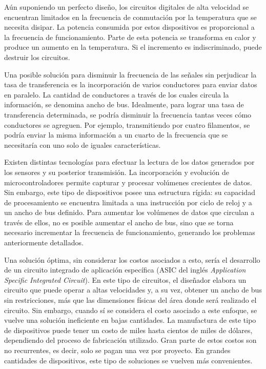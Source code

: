 Aún suponiendo un perfecto diseño, los circuitos digitales de alta velocidad se encuentran limitados en la frecuencia de conmutación por la temperatura que se necesita disipar. La potencia consumida por estos dispositivos es proporcional a la frecuencia de funcionamiento\cite{Wakerly1999}. Parte de esta potencia se transforma en calor y produce un aumento en la temperatura. Si el incremento es indiscriminado, puede destruir los circuitos.%

Una posible solución para disminuir la frecuencia de las señales sin perjudicar la tasa de transferencia es la incorporación de varios conductores para enviar datos en paralelo.
La cantidad de conductores a través de los cuales circula la información, se denomina ancho de bus. Idealmente, para lograr una tasa de transferencia determinada, se podría disminuir la frecuencia tantas veces cómo conductores se agreguen. Por ejemplo, transmitiendo por cuatro filamentos, se podría enviar la misma información a un cuarto de la frecuencia que se necesitaría con uno solo de iguales características.%

Existen distintas tecnologías para efectuar la lectura de los datos generados por los sensores y su posterior transmisión. La incorporación y evolución de microcontroladores permite capturar y procesar volúmenes crecientes de datos. Sin embargo, este tipo de dispositivos posee una estructura rígida: su capacidad de procesamiento se encuentra limitada a una instrucción por ciclo de reloj y a un ancho de bus definido. Para aumentar los volúmenes de datos que circulan a través de ellos, no es posible aumentar el ancho de bus, sino que se torna necesario incrementar la frecuencia de funcionamiento, generando los problemas anteriormente detallados.%

Una solución óptima, sin considerar los costos asociados a esto, sería el desarrollo de un circuito integrado de aplicación específica (ASIC del inglés {\it Application Specific Integrated Circuit}). En este tipo de circuitos, el diseñador elabora un circuito que puede operar a altas velocidades y, a su vez, obtener un ancho de bus sin restricciones, más que las dimensiones físicas del área donde será realizado el circuito. Sin embargo, cuando sí se considera el costo asociado a este enfoque, se vuelve una solución ineficiente en bajas cantidades. La manufactura de este tipo de dispositivos puede tener un costo de miles hasta cientos de miles de dólares, dependiendo del proceso de fabricación utilizado. Gran parte de estos costos son no recurrentes, es decir, solo se pagan una vez por proyecto. En grandes cantidades de dispositivos, este tipo de soluciones se vuelven más convenientes.%

